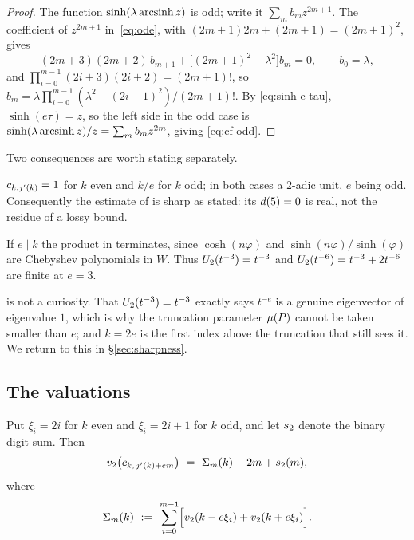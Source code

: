 \begin{proof}
The function $\sinh(\lambda\operatorname{arcsinh} z)$ is odd; write it $\sum_m b_m
z^{2m+1}$. The coefficient of $z^{2m+1}$ in~\eqref{eq:ode}, with
$(2m+1)2m + (2m+1) = (2m+1)^2$, gives
\[
  (2m+3)(2m+2)\,b_{m+1} + \bigl[(2m+1)^2 - \lambda^2\bigr] b_m = 0,
  \qquad b_0 = \lambda,
\]
and $\prod_{i=0}^{m-1}(2i+3)(2i+2) = (2m+1)!$, so $b_m = \lambda
\prod_{i=0}^{m-1}(\lambda^2 - (2i+1)^2)/(2m+1)!$. By
\eqref{eq:sinh-e-tau}, $\sinh(e\tau) = z$, so the left side in the odd case
is $\sinh(\lambda\operatorname{arcsinh} z)/z = \sum_m b_m z^{2m}$, giving
\eqref{eq:cf-odd}.
\end{proof}

Two consequences are worth stating separately.

\begin{corollary}
\label{cor:leading-unit}
$c_{k,j'(k)} = 1$ for $k$ even and $k/e$ for $k$ odd; in both cases a
$2$-adic unit, $e$ being odd. Consequently the estimate of
\textup{\cite[Remark 6.5]{kramermillerupton2021newton}} is sharp as stated: its
$d(5) = 0$ is real, not the residue of a lossy bound.
\end{corollary}

\begin{corollary}
\label{cor:chebyshev}
If $e \mid k$ the product in  terminates, since
$\cosh(n\varphi)$ and $\sinh(n\varphi)/\sinh(\varphi)$ are Chebyshev
polynomials in $W$. Thus $U_2(t^{-3}) = t^{-3}$ and $U_2(t^{-6}) =
t^{-3} + 2t^{-6}$ are finite at $e = 3$.
\end{corollary}

 is not a curiosity. That $U_2(t^{-3}) = t^{-3}$
exactly says $t^{-e}$ is a genuine eigenvector of eigenvalue $1$, which is
why the truncation parameter $\mu(P)$ cannot be taken smaller than $e$; and
$k = 2e$ is the first index above the truncation that still sees it. We
return to this in \S\ref{sec:sharpness}.

\subsection{The valuations}
\label{sec:valuations}

\begin{theorem}
\label{thm:valuation}
Put $\xi_i = 2i$ for $k$ even and $\xi_i = 2i+1$ for $k$ odd, and let
$s_2$ denote the binary digit sum. Then
\[
  v_2\bigl( c_{k,\,j'(k)+em} \bigr)
  \ = \ \Sigma_m(k) - 2m + s_2(m),
\]
where
\[
  \Sigma_m(k) \ := \ \sum_{i=0}^{m-1}
    \Bigl[ v_2(k - e\xi_i) + v_2(k + e\xi_i) \Bigr].
\]
\end{theorem}

